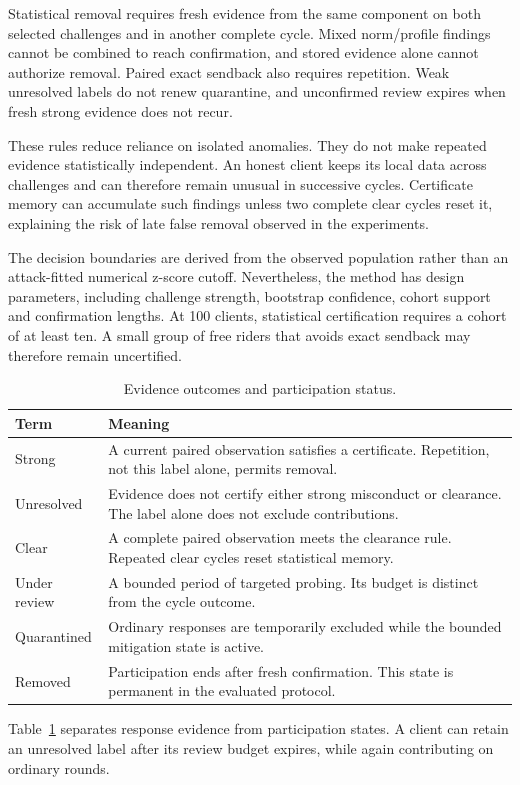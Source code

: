 \documentclass[journal]{IEEEtran}
\makeatletter
\renewcommand{\subsection}{\@startsection{subsection}{2}{\z@}{1.5ex}{0.7ex}{\normalfont\normalsize\itshape}}
\makeatother
\begin{document}
\subsection{Confirmation and Honest-Client Safety}
Statistical removal requires fresh evidence from the same component
on both selected challenges and in another complete cycle. Mixed
norm/profile findings cannot be combined to reach confirmation, and
stored evidence alone cannot authorize removal. Paired exact sendback
also requires repetition. Weak unresolved labels do not renew quarantine,
and unconfirmed review expires when fresh strong evidence does not recur.

These rules reduce reliance on isolated anomalies. They do not make
repeated evidence statistically independent. An honest client keeps
its local data across challenges and can therefore remain unusual in
successive cycles. Certificate memory can accumulate such findings
unless two complete clear cycles reset it, explaining the risk of late
false removal observed in the experiments.

The decision boundaries are derived from the observed population rather
than an attack-fitted numerical z-score cutoff. Nevertheless, the method
has design parameters, including challenge strength, bootstrap confidence,
cohort support and confirmation lengths. At 100 clients, statistical
certification requires a cohort of at least ten. A small group of free
riders that avoids exact sendback may therefore remain uncertified.

\begin{table}[t]\centering\footnotesize
\caption{Evidence outcomes and participation status.}\label{tab:status-meaning}
\begin{tabular}{p{}p{}}\toprule
Term & Meaning \\ \midrule
Strong & A current paired observation satisfies a certificate. Repetition, not this label alone, permits removal. \\
Unresolved & Evidence does not certify either strong misconduct or clearance. The label alone does not exclude contributions. \\
Clear & A complete paired observation meets the clearance rule. Repeated clear cycles reset statistical memory. \\
Under review & A bounded period of targeted probing. Its budget is distinct from the cycle outcome. \\
Quarantined & Ordinary responses are temporarily excluded while the bounded mitigation state is active. \\
Removed & Participation ends after fresh confirmation. This state is permanent in the evaluated protocol. \\ \bottomrule
\end{tabular}\end{table}
Table~\ref{tab:status-meaning} separates response evidence from participation
states. A client can retain an unresolved label after its review budget
expires, while again contributing on ordinary rounds.
\end{document}
